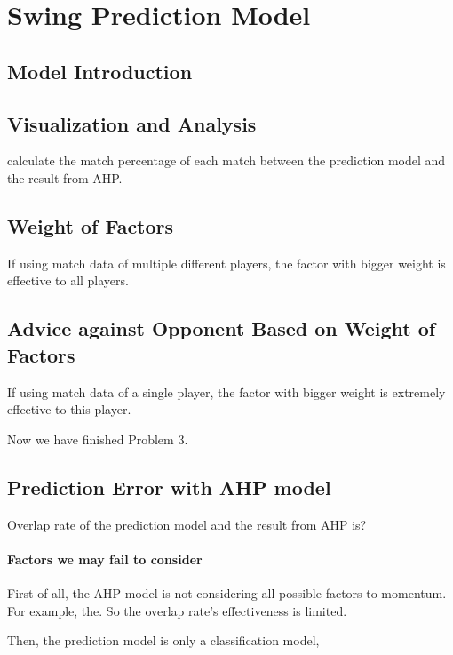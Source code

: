 \section{Swing Prediction Model}

\subsection{Model Introduction}

\subsection{Visualization and Analysis}

calculate the match percentage of each match between the prediction model and the result from AHP.

\subsection{Weight of Factors}

If using match data of multiple different players, the factor with bigger weight is effective to 
all players.

\subsection{Advice against Opponent Based on Weight of Factors}

If using match data of a single player, the factor with bigger weight is extremely effective to 
this player.

Now we have finished Problem 3.

\subsection{Prediction Error with AHP model}

Overlap rate of the prediction model and the result from AHP is?

\paragraph{Factors we may fail to consider}

First of all, the AHP model is not considering all possible factors to momentum.
For example, the.
So the overlap rate's effectiveness is limited.

Then, the prediction model is only a classification model,